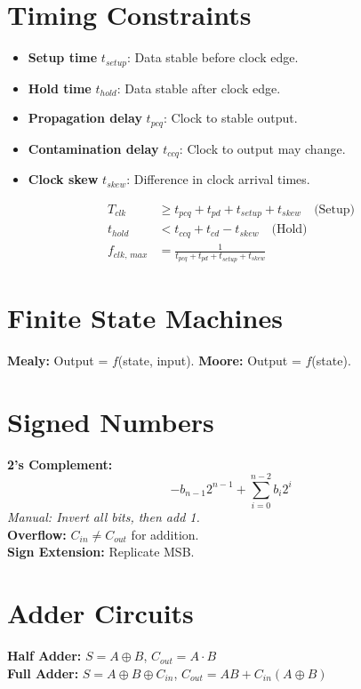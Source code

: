 \documentclass[8pt]{article}
\begin{document}
\section*{Timing Constraints}
\begin{itemize}
    \item \textbf{Setup time} $t_{setup}$: Data stable before clock edge.
    \item \textbf{Hold time} $t_{hold}$: Data stable after clock edge.
    \item \textbf{Propagation delay} $t_{pcq}$: Clock to stable output.
    \item \textbf{Contamination delay} $t_{ccq}$: Clock to output may change.
    \item \textbf{Clock skew} $t_{skew}$: Difference in clock arrival times.
\end{itemize}
\begin{align*}
    T_{clk}       & \geq t_{pcq} + t_{pd} + t_{setup} + t_{skew} \quad \text{(Setup)} \\
    t_{hold}      & < t_{ccq} + t_{cd} - t_{skew} \quad \text{(Hold)}                 \\
    f_{clk,\,max} & = \frac{1}{t_{pcq} + t_{pd} + t_{setup} + t_{skew}}
\end{align*}

\section*{Finite State Machines}
\textbf{Mealy:} Output = $f$(state, input). \quad
\textbf{Moore:} Output = $f$(state).

\section*{Signed Numbers}
\textbf{2's Complement:}
\[
    -b_{n-1}2^{n-1} + \sum_{i=0}^{n-2} b_i2^i
\]
\textit{Manual: Invert all bits, then add 1.}\\
\textbf{Overflow:} $C_{in} \neq C_{out}$ for addition. \\
\textbf{Sign Extension:} Replicate MSB.

\section*{Adder Circuits}
\textbf{Half Adder:} $S = A \oplus B$, $C_{out} = A \cdot B$ \\
\textbf{Full Adder:} $S = A \oplus B \oplus C_{in}$, $C_{out} = AB + C_{in}(A \oplus B)$
\end{document}
